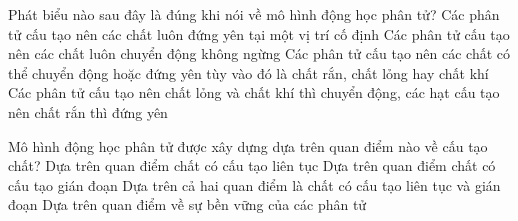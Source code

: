 \begin{ex}%
	Phát biểu nào sau đây là đúng khi nói về mô hình động học phân tử?
	\choice
	{Các phân tử cấu tạo nên các chất luôn đứng yên tại một vị trí cố định}
	{\True Các phân tử cấu tạo nên các chất luôn chuyển động không ngừng}
	{Các phân tử cấu tạo nên các chất có thể chuyển động hoặc đứng yên tùy vào đó là chất rắn, chất lỏng hay chất khí}
	{Các phân tử cấu tạo nên chất lỏng và chất khí thì chuyển động, các hạt cấu tạo nên chất rắn thì đứng yên}
\end{ex}



\begin{ex}%
	Mô hình động học phân tử được xây dựng dựa trên quan điểm nào về cấu tạo chất?
	\choice
	{Dựa trên quan điểm chất có cấu tạo liên tục}
	{\True Dựa trên quan điểm chất có cấu tạo gián đoạn}
	{Dựa trên cả hai quan điểm là chất có cấu tạo liên tục và gián đoạn}
	{Dựa trên quan điểm về sự bền vững của các phân tử}
\end{ex}



